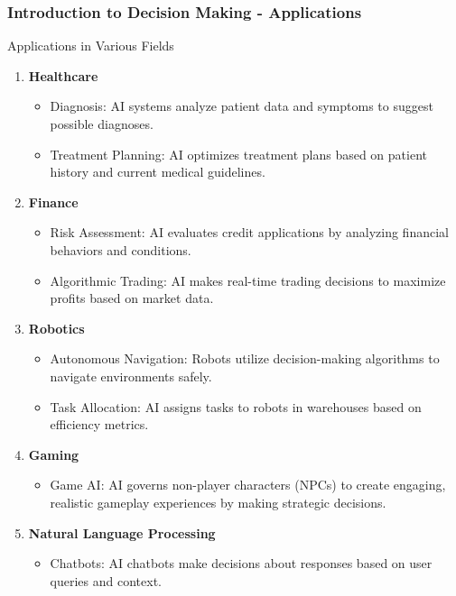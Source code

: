 \documentclass[aspectratio=169]{beamer}
\begin{document}
\begin{frame}[fragile]
    \frametitle{Introduction to Decision Making - Applications}
    \begin{block}{Applications in Various Fields}
        \begin{enumerate}
            \item \textbf{Healthcare}
                \begin{itemize}
                    \item Diagnosis: AI systems analyze patient data and symptoms to suggest possible diagnoses.
                    \item Treatment Planning: AI optimizes treatment plans based on patient history and current medical guidelines.
                \end{itemize}
            \item \textbf{Finance}
                \begin{itemize}
                    \item Risk Assessment: AI evaluates credit applications by analyzing financial behaviors and conditions.
                    \item Algorithmic Trading: AI makes real-time trading decisions to maximize profits based on market data.
                \end{itemize}
            \item \textbf{Robotics}
                \begin{itemize}
                    \item Autonomous Navigation: Robots utilize decision-making algorithms to navigate environments safely.
                    \item Task Allocation: AI assigns tasks to robots in warehouses based on efficiency metrics.
                \end{itemize}
            \item \textbf{Gaming}
                \begin{itemize}
                    \item Game AI: AI governs non-player characters (NPCs) to create engaging, realistic gameplay experiences by making strategic decisions.
                \end{itemize}
            \item \textbf{Natural Language Processing}
                \begin{itemize}
                    \item Chatbots: AI chatbots make decisions about responses based on user queries and context.
                \end{itemize}
        \end{enumerate}
    \end{block}
\end{frame}
\end{document}
